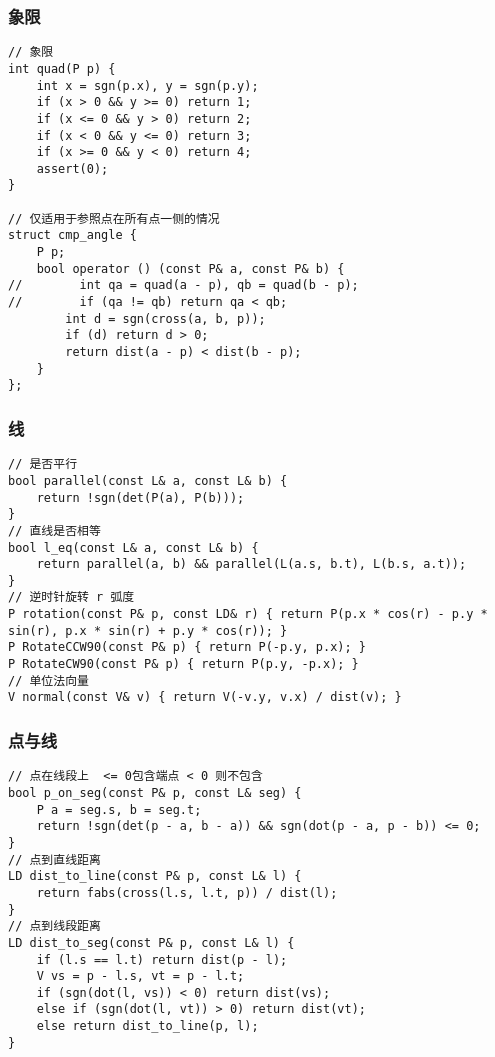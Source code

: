 \documentclass[]{article}
\begin{document}
\hypertarget{ux8c61ux9650}{%
\subsubsection{象限}\label{ux8c61ux9650}}

\begin{verbatim}
// 象限
int quad(P p) {
    int x = sgn(p.x), y = sgn(p.y);
    if (x > 0 && y >= 0) return 1;
    if (x <= 0 && y > 0) return 2;
    if (x < 0 && y <= 0) return 3;
    if (x >= 0 && y < 0) return 4;
    assert(0);
}

// 仅适用于参照点在所有点一侧的情况
struct cmp_angle {
    P p;
    bool operator () (const P& a, const P& b) {
//        int qa = quad(a - p), qb = quad(b - p);
//        if (qa != qb) return qa < qb;
        int d = sgn(cross(a, b, p));
        if (d) return d > 0;
        return dist(a - p) < dist(b - p);
    }
};
\end{verbatim}

\hypertarget{ux7ebf}{%
\subsubsection{线}\label{ux7ebf}}

\begin{verbatim}
// 是否平行
bool parallel(const L& a, const L& b) {
    return !sgn(det(P(a), P(b)));
}
// 直线是否相等
bool l_eq(const L& a, const L& b) {
    return parallel(a, b) && parallel(L(a.s, b.t), L(b.s, a.t));
}
// 逆时针旋转 r 弧度
P rotation(const P& p, const LD& r) { return P(p.x * cos(r) - p.y * sin(r), p.x * sin(r) + p.y * cos(r)); }
P RotateCCW90(const P& p) { return P(-p.y, p.x); }
P RotateCW90(const P& p) { return P(p.y, -p.x); }
// 单位法向量
V normal(const V& v) { return V(-v.y, v.x) / dist(v); }
\end{verbatim}

\hypertarget{ux70b9ux4e0eux7ebf}{%
\subsubsection{点与线}\label{ux70b9ux4e0eux7ebf}}

\begin{verbatim}
// 点在线段上  <= 0包含端点 < 0 则不包含
bool p_on_seg(const P& p, const L& seg) {
    P a = seg.s, b = seg.t;
    return !sgn(det(p - a, b - a)) && sgn(dot(p - a, p - b)) <= 0;
}
// 点到直线距离
LD dist_to_line(const P& p, const L& l) {
    return fabs(cross(l.s, l.t, p)) / dist(l);
}
// 点到线段距离
LD dist_to_seg(const P& p, const L& l) {
    if (l.s == l.t) return dist(p - l);
    V vs = p - l.s, vt = p - l.t;
    if (sgn(dot(l, vs)) < 0) return dist(vs);
    else if (sgn(dot(l, vt)) > 0) return dist(vt);
    else return dist_to_line(p, l);
}
\end{verbatim}
\end{document}
